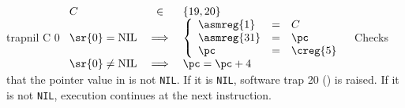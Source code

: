 \begin{instruction}{trapnil}\label{inst:trapnil}
     {C}
     {0}
     { %
       \begin{math}
         \begin{array}{lcl}
           C & \in & \lbrace 19, 20 \rbrace \\
           \sr{0} = \textrm{NIL} & \implies &
           \left\lbrace
           \begin{array}{lcl}
             \asmreg{1} & = & C \\
             \asmreg{31} & = & \pc \\
             \pc & = & \creg{5} \\
           \end{array}
           \right. \\
           \sr{0} \neq \textrm{NIL} & \implies & \pc = \pc + 4 \\
         \end{array}
       \end{math}
     }
     {
       Checks that the pointer value in  is not \texttt{NIL}.
       If it is \texttt{NIL}, software trap 20 () is
       raised.  If it is not \texttt{NIL}, execution continues at the
       next instruction.
     }
\end{instruction}


